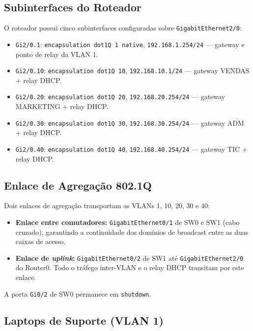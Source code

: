 \documentclass[12pt,a4paper]{article}
\begin{document}
\subsection{Subinterfaces do Roteador}

O roteador possui cinco subinterfaces configuradas sobre \texttt{GigabitEthernet2/0}:

\begin{itemize}[leftmargin=2em]
  \item \texttt{Gi2/0.1}: \texttt{encapsulation dot1Q 1 native},
        \texttt{192.168.1.254/24} --- gateway e ponto de relay da VLAN 1.
  \item \texttt{Gi2/0.10}: \texttt{encapsulation dot1Q 10},
        \texttt{192.168.10.1/24} --- gateway VENDAS + relay DHCP.
  \item \texttt{Gi2/0.20}: \texttt{encapsulation dot1Q 20},
        \texttt{192.168.20.254/24} --- gateway MARKETING + relay DHCP.
  \item \texttt{Gi2/0.30}: \texttt{encapsulation dot1Q 30},
        \texttt{192.168.30.254/24} --- gateway ADM + relay DHCP.
  \item \texttt{Gi2/0.40}: \texttt{encapsulation dot1Q 40},
        \texttt{192.168.40.254/24} --- gateway TIC + relay DHCP.
\end{itemize}

\subsection{Enlace de Agregação 802.1Q}

Dois enlaces de agregação transportam as VLANs 1, 10, 20, 30 e 40:

\begin{itemize}[leftmargin=2em]
  \item \textbf{Enlace entre comutadores:} \texttt{GigabitEthernet0/1} de SW0
        e SW1 (cabo cruzado), garantindo a continuidade dos domínios de broadcast
        entre as duas caixas de acesso.
  \item \textbf{Enlace de \textit{uplink}:} \texttt{GigabitEthernet0/2} de SW1
        até \texttt{GigabitEthernet2/0} do Router0. Todo o tráfego inter-VLAN e
        o relay DHCP transitam por este enlace.
\end{itemize}

A porta \texttt{Gi0/2} de SW0 permanece em \texttt{shutdown}.

\subsection{Laptops de Suporte (VLAN 1)}
\end{document}
